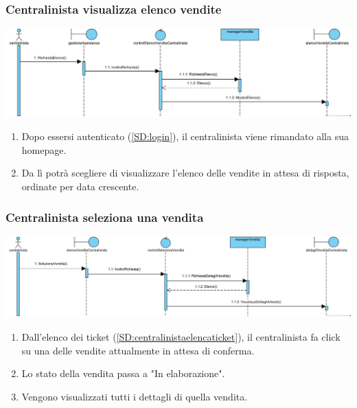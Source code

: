 \documentclass[12pt,a4paper]{article}
\begin{document}
\subsubsection{Centralinista visualizza elenco vendite}
\label{SD:elencovenditecentralinista}

\begin{center}
\includegraphics[width=\textwidth]{SequenceDiagram/CentralinistaVenditeElenco}
\end{center}

\begin{enumerate}
\item Dopo essersi autenticato (\ref{SD:login}), il centralinista viene rimandato alla sua homepage. 
\item Da lì potrà scegliere di visualizzare l'elenco delle vendite in attesa di risposta, ordinate per data crescente.
\end{enumerate}

\subsubsection{Centralinista seleziona una vendita}
\label{SD:selezionevenditacentralinista}

\begin{center}
\includegraphics[width=\textwidth]{SequenceDiagram/CentralinistaVenditaSeleziona}
\end{center}

\begin{enumerate}
\item Dall'elenco dei ticket (\ref{SD:centralinistaelencaticket}), il centralinista fa click su una delle vendite attualmente in attesa di conferma.
\item Lo stato della vendita passa a "In elaborazione".
\item Vengono visualizzati tutti i dettagli di quella vendita.
\end{enumerate}
\end{document}
